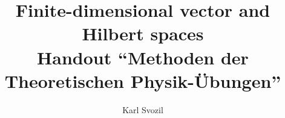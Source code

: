 \documentclass[prl,preprint,showpacs,showkeys,amsfonts]{revtex4}
\usepackage{graphicx}
 \RequirePackage{times}
\RequirePackage{mathptm}






\title{Finite-dimensional  vector and Hilbert spaces\\
Handout ``Methoden der Theoretischen Physik-\"Ubungen''}
\author{Karl Svozil}

\begin{abstract}
Linear vector spaces and some of their basic principles are introduced.
\end{abstract}



\maketitle


\section{Definition}


A quantum mechanical {\em (linear) vector space} is a linear
\index{vector space}
vector space ${\frak V}$ over the field ${\Bbb C}$ of complex numbers
(with vector addition
and scalar multiplication),
such that
(i)
$(x,x)=0$ if and only if $x=0$;
(ii)
$(x,x)$ for all $x $;
(iii)
$(x+y,z)=(x,z)+(y,z)$ for all $x,y,z $;
(iv)
$(\alpha x,y)=\alpha (x,y)$ for all $x,y , \alpha {}$;
(v)
$(x,y)={(y,x)}^\ast $ for all $x,y $
(${\alpha }^\ast $ stands for the complex conjugate of $\alpha$);



